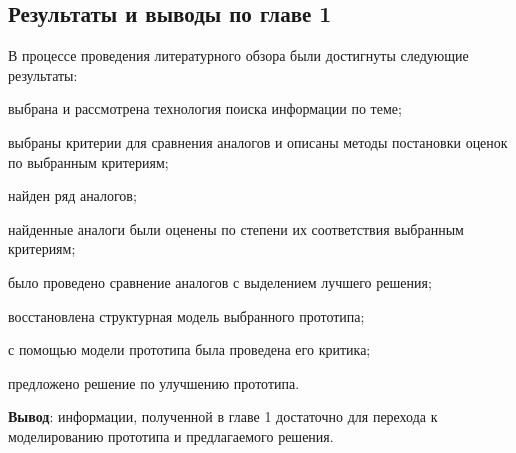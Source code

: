\subsection{Результаты и выводы по главе 1}

В процессе проведения литературного обзора были достигнуты следующие результаты:
\begin{list}{}{\leftmargin=1.5cm}
	\item выбрана и рассмотрена технология поиска информации по теме;
	\item выбраны критерии для сравнения аналогов и описаны методы постановки оценок по выбранным критериям;
	\item найден ряд аналогов;
	\item найденные аналоги были оценены по степени их соответствия выбранным критериям;
	\item было проведено сравнение аналогов с выделением лучшего решения;
	\item восстановлена структурная модель выбранного прототипа;
	\item с помощью модели прототипа была проведена его критика;
	\item предложено решение по улучшению прототипа.
\end{list}

\textbf{Вывод}: информации, полученной в главе 1 достаточно для перехода к моделированию прототипа и предлагаемого решения.
